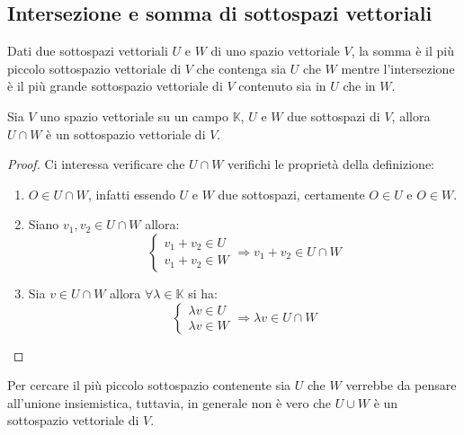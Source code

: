

\subsection{Intersezione e somma di sottospazi vettoriali}
Dati due sottospazi vettoriali $U$ e $W$ di uno spazio vettoriale $V$,
la somma \`e il pi\`u piccolo sottospazio vettoriale di $V$
che contenga sia $U$ che $W$ mentre l'intersezione \`e il pi\`u
grande sottospazio vettoriale di $V$ contenuto sia in $U$ che in $W$.

\begin{proposition}
	Sia $V$ uno spazio vettoriale su un campo $\mathbb{K}$, $U$ e $W$ due
	sottospazi di $V$, allora $U \cap W$ \`e un sottospazio vettoriale di $V$.
	\begin{proof}
		Ci interessa verificare che $U \cap W$ verifichi le propriet\`a della
		definizione:
		\begin{enumerate}
			\item $O \in U \cap W$, infatti essendo $U$ e $W$ due sottospazi,
			      certamente $O \in U$ e $O \in W$.
			\item Siano $v_1, v_2 \in U \cap W$ allora:
			      \begin{equation*}
				      \begin{cases}
					      v_1 + v_2 \in U \\
					      v_1 + v_2 \in W
				      \end{cases}
				      \Rightarrow{v_1 + v_2 \in U \cap W}
			      \end{equation*}
			\item Sia $v \in U \cap W$ allora $\forall \lambda \in
				      \mathbb{K}$ si ha:
			      \begin{equation*}
				      \begin{cases}
					      \lambda v \in U \\
					      \lambda v \in W
				      \end{cases}
				      \Rightarrow{\lambda v \in U \cap W}
			      \end{equation*}
		\end{enumerate}
	\end{proof}
\end{proposition}

Per cercare il pi\`u piccolo sottospazio contenente sia $U$ che $W$
verrebbe da pensare all'unione insiemistica, tuttavia, in generale non
\`e vero che $U \cup W$ \`e un sottospazio vettoriale di $V$.


